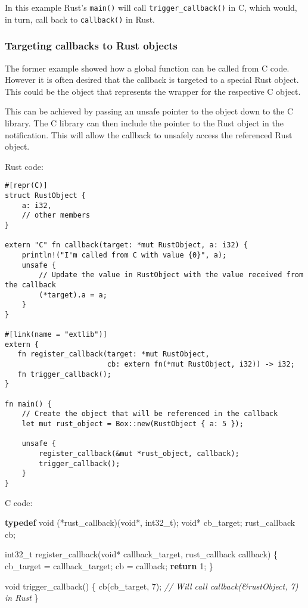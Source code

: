 \documentclass[a4paper,]{book}
\newenvironment{Shaded}{\begin{snugshade}}{\end{snugshade}}
\newcommand{\KeywordTok}[1]{\textcolor[rgb]{0.13,0.29,0.53}{\textbf{{#1}}}}
\newcommand{\DataTypeTok}[1]{\textcolor[rgb]{0.13,0.29,0.53}{{#1}}}
\newcommand{\DecValTok}[1]{\textcolor[rgb]{0.00,0.00,0.81}{{#1}}}
\newcommand{\CommentTok}[1]{\textcolor[rgb]{0.56,0.35,0.01}{\textit{{#1}}}}
\newcommand{\NormalTok}[1]{{#1}}
\begin{document}
In this example Rust's \texttt{main()} will call
\texttt{trigger\_callback()} in C, which would, in turn, call back to
\texttt{callback()} in Rust.

\subsubsection{Targeting callbacks to Rust
objects}\label{targeting-callbacks-to-rust-objects}

The former example showed how a global function can be called from C
code. However it is often desired that the callback is targeted to a
special Rust object. This could be the object that represents the
wrapper for the respective C object.

This can be achieved by passing an unsafe pointer to the object down to
the C library. The C library can then include the pointer to the Rust
object in the notification. This will allow the callback to unsafely
access the referenced Rust object.

Rust code:

\begin{verbatim}
#[repr(C)]
struct RustObject {
    a: i32,
    // other members
}

extern "C" fn callback(target: *mut RustObject, a: i32) {
    println!("I'm called from C with value {0}", a);
    unsafe {
        // Update the value in RustObject with the value received from the callback
        (*target).a = a;
    }
}

#[link(name = "extlib")]
extern {
   fn register_callback(target: *mut RustObject,
                        cb: extern fn(*mut RustObject, i32)) -> i32;
   fn trigger_callback();
}

fn main() {
    // Create the object that will be referenced in the callback
    let mut rust_object = Box::new(RustObject { a: 5 });

    unsafe {
        register_callback(&mut *rust_object, callback);
        trigger_callback();
    }
}
\end{verbatim}

C code:

\begin{Shaded}
\begin{Highlighting}[]
\KeywordTok{typedef} \DataTypeTok{void} \NormalTok{(*rust_callback)(}\DataTypeTok{void}\NormalTok{*, }\DataTypeTok{int32_t}\NormalTok{);}
\DataTypeTok{void}\NormalTok{* cb_target;}
\NormalTok{rust_callback cb;}

\DataTypeTok{int32_t} \NormalTok{register_callback(}\DataTypeTok{void}\NormalTok{* callback_target, rust_callback callback) \{}
    \NormalTok{cb_target = callback_target;}
    \NormalTok{cb = callback;}
    \KeywordTok{return} \DecValTok{1}\NormalTok{;}
\NormalTok{\}}

\DataTypeTok{void} \NormalTok{trigger_callback() \{}
  \NormalTok{cb(cb_target, }\DecValTok{7}\NormalTok{); }\CommentTok{// Will call callback(&rustObject, 7) in Rust}
\NormalTok{\}}
\end{Highlighting}
\end{Shaded}
\end{document}
